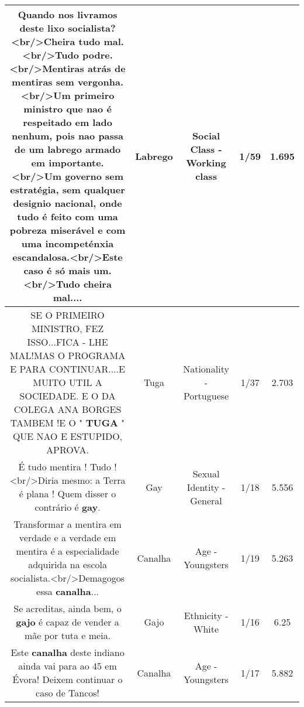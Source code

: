 \documentclass[11pt]{article}
\newlength\mylength
\begin{document}
\begin{center}
\begin{longtable}{|C{.65\mylength}|C{.30\mylength}|C{.12\mylength}|C{.12\mylength}|C{.12\mylength}|}
  \small Quando nos livramos deste lixo socialista?<br/>Cheira tudo mal.<br/>Tudo podre.<br/>Mentiras atrás de mentiras sem vergonha.<br/>Um primeiro ministro que nao é respeitado em lado nenhum, pois nao passa de um \textbf{labrego} armado em importante.<br/>Um governo sem estratégia, sem qualquer designio nacional, onde tudo é feito com uma pobreza miserável e com uma incompeténxia escandalosa.<br/>Este caso é só mais um.<br/>Tudo cheira mal....\normalsize   & Labrego & Social Class - Working class & 1/59 & 1.695 \\  \hline
  \small SE O PRIMEIRO MINISTRO, FEZ ISSO...FICA - LHE MAL!MAS O PROGRAMA E PARA CONTINUAR....E MUITO UTIL A SOCIEDADE. E O DA COLEGA ANA BORGES TAMBEM !E O " \textbf{TUGA} " QUE NAO E ESTUPIDO, APROVA.\normalsize   & Tuga & Nationality - Portuguese & 1/37 & 2.703 \\  \hline
  \small É tudo mentira ! Tudo !<br/>Diria mesmo: a Terra é plana ! Quem disser o contrário é \textbf{gay}.\normalsize   & Gay & Sexual Identity - General & 1/18 & 5.556 \\  \hline
  \small Transformar a mentira em verdade e a verdade em mentira é a especialidade  adquirida na  escola socialista.<br/>Demagogos essa \textbf{canalha}...\normalsize   & Canalha & Age - Youngsters & 1/19 & 5.263 \\  \hline
  \small Se acreditas, ainda bem, o \textbf{gajo} é capaz de vender a mãe por tuta e meia.\normalsize   & Gajo & Ethnicity - White & 1/16 & 6.25 \\  \hline
  \small Este \textbf{canalha} deste indiano ainda vai para ao 45 em Évora! Deixem continuar o caso de Tancos!\normalsize   & Canalha & Age - Youngsters & 1/17 & 5.882 \\  \hline
  
\end{longtable}
\end{center}
\end{document}
